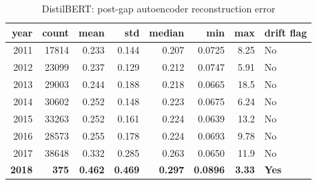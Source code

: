\begin{table}[ht]
\centering
\caption{DistilBERT: post-gap autoencoder reconstruction error}
\label{tab:distilbert_ae_yearly}
\begin{tabular}{rrrrrrrl}
\toprule
year & count & mean & std & median & min & max & drift flag \\
\midrule
2011 & 17814 & 0.233 & 0.144 & 0.207 & 0.0725 & 8.25 & No \\
2012 & 23099 & 0.237 & 0.129 & 0.212 & 0.0747 & 5.91 & No \\
2013 & 29003 & 0.244 & 0.188 & 0.218 & 0.0665 & 18.5 & No \\
2014 & 30602 & 0.252 & 0.148 & 0.223 & 0.0675 & 6.24 & No \\
2015 & 33263 & 0.252 & 0.161 & 0.224 & 0.0639 & 13.2 & No \\
2016 & 28573 & 0.255 & 0.178 & 0.224 & 0.0693 & 9.78 & No \\
2017 & 38648 & 0.332 & 0.285 & 0.263 & 0.0650 & 11.9 & No \\
\textbf{2018} & \textbf{375} & \textbf{0.462} & \textbf{0.469} & \textbf{0.297} & \textbf{0.0896} & \textbf{3.33} & \textbf{Yes} \\
\bottomrule
\end{tabular}
\end{table}
